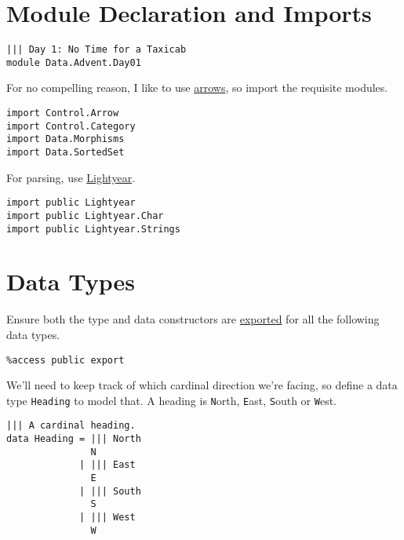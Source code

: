 \newpage

\section{Module Declaration and
Imports}\label{module-declaration-and-imports}

\begin{verbatim}
||| Day 1: No Time for a Taxicab
module Data.Advent.Day01
\end{verbatim}

For no compelling reason, I like to use
\href{https://www.haskell.org/arrows/}{arrows}, so import the requisite
modules.

\begin{verbatim}
import Control.Arrow
import Control.Category
import Data.Morphisms
import Data.SortedSet
\end{verbatim}

For parsing, use \href{https://github.com/ziman/lightyear}{Lightyear}.

\begin{verbatim}
import public Lightyear
import public Lightyear.Char
import public Lightyear.Strings
\end{verbatim}

\section{Data Types}\label{data-types}

Ensure both the type and data constructors are
\href{http://docs.idris-lang.org/en/latest/tutorial/modules.html\#meaning-for-data-types}{exported}
for all the following data types.

\begin{verbatim}
%access public export
\end{verbatim}

We'll need to keep track of which cardinal direction we're facing, so
define a data type \texttt{Heading} to model that. A
heading is \texttt{N}orth, \texttt{E}ast,
\texttt{S}outh or \texttt{W}est.

\begin{verbatim}
||| A cardinal heading.
data Heading = ||| North
               N
             | ||| East
               E
             | ||| South
               S
             | ||| West
               W
\end{verbatim}

